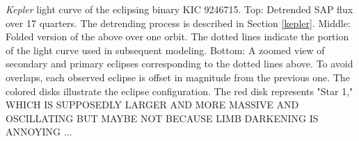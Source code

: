\label{fig:keplerfig} \emph{Kepler} light curve of the eclipsing binary KIC 9246715. Top: Detrended SAP flux over 17 quarters. The detrending process is described in Section \ref{kepler}. Middle: Folded version of the above over one orbit. The dotted lines indicate the portion of the light curve used in subsequent modeling. Bottom: A zoomed view of secondary and primary eclipses corresponding to the dotted lines above. To avoid overlaps, each observed eclipse is offset in magnitude from the previous one. The colored disks illustrate the eclipse configuration. The red disk represents "Star 1," WHICH IS SUPPOSEDLY LARGER AND MORE MASSIVE AND OSCILLATING BUT MAYBE NOT BECAUSE LIMB DARKENING IS ANNOYING ... 